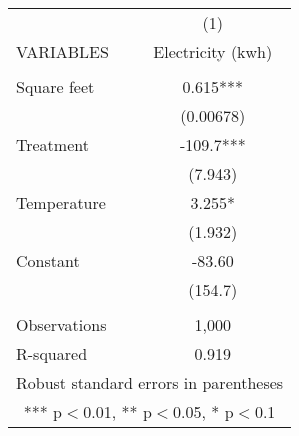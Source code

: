 \begin{tabular}{lc} \hline
 & (1) \\
VARIABLES & Electricity (kwh) \\ \hline
 &  \\
Square feet & 0.615*** \\
 & (0.00678) \\
Treatment & -109.7*** \\
 & (7.943) \\
Temperature & 3.255* \\
 & (1.932) \\
Constant & -83.60 \\
 & (154.7) \\
 &  \\
Observations & 1,000 \\
 R-squared & 0.919 \\ \hline
\multicolumn{2}{c}{ Robust standard errors in parentheses} \\
\multicolumn{2}{c}{ *** p$<$0.01, ** p$<$0.05, * p$<$0.1} \\
\end{tabular}

